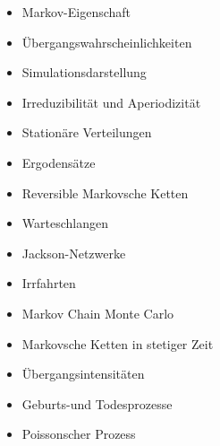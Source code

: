 \begin{course}
\begin{content}
\begin{itemize}\item Markov-Eigenschaft  \item Übergangswahrscheinlichkeiten  \item Simulationsdarstellung  \item Irreduzibilität und Aperiodizität  \item Stationäre Verteilungen  \item Ergodensätze  \item Reversible Markovsche Ketten  \item Warteschlangen  \item Jackson-Netzwerke  \item Irrfahrten  \item Markov Chain Monte Carlo  \item Markovsche Ketten in stetiger Zeit  \item Übergangsintensitäten  \item Geburts-und Todesprozesse  \item Poissonscher Prozess  \end{itemize}
\end{content}







\end{course}